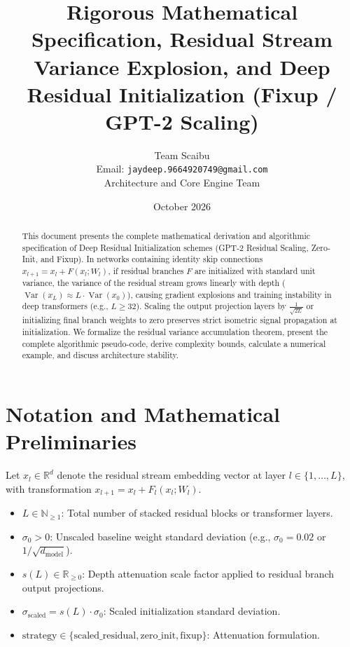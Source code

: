 \documentclass[11pt,a4paper]{article}
\title{\textbf{Rigorous Mathematical Specification, Residual Stream Variance Explosion, and Deep Residual Initialization (Fixup / GPT-2 Scaling)}}
\author{Team Scaibu \\ \small Email: \texttt{jaydeep.9664920749@gmail.com} \\ \small Architecture and Core Engine Team}
\date{October 2026}
\theoremstyle{definition}
\begin{document}
\maketitle

\begin{abstract}
This document presents the complete mathematical derivation and algorithmic specification of Deep Residual Initialization schemes (GPT-2 Residual Scaling, Zero-Init, and Fixup). In networks containing identity skip connections $x_{l+1} = x_l + F(x_l; W_l)$, if residual branches $F$ are initialized with standard unit variance, the variance of the residual stream grows linearly with depth ($\operatorname{Var}(x_L) \approx L \cdot \operatorname{Var}(x_0)$), causing gradient explosions and training instability in deep transformers (e.g., $L \ge 32$). Scaling the output projection layers by $\frac{1}{\sqrt{2L}}$ or initializing final branch weights to zero preserves strict isometric signal propagation at initialization. We formalize the residual variance accumulation theorem, present the complete algorithmic pseudo-code, derive complexity bounds, calculate a numerical example, and discuss architecture stability.
\end{abstract}

\section{Notation and Mathematical Preliminaries}

Let $x_l \in \mathbb{R}^d$ denote the residual stream embedding vector at layer $l \in \{1, \dots, L\}$, with transformation $x_{l+1} = x_l + F_l(x_l; W_l)$.

\begin{itemize}
    \item $L \in \mathbb{N}_{\ge 1}$: Total number of stacked residual blocks or transformer layers.
    \item $\sigma_0 > 0$: Unscaled baseline weight standard deviation (e.g., $\sigma_0 = 0.02$ or $1 / \sqrt{d_{\text{model}}}$).
    \item $s(L) \in \mathbb{R}_{\ge 0}$: Depth attenuation scale factor applied to residual branch output projections.
    \item $\sigma_{\text{scaled}} = s(L) \cdot \sigma_0$: Scaled initialization standard deviation.
    \item $\text{strategy} \in \{\text{scaled\_residual}, \text{zero\_init}, \text{fixup}\}$: Attenuation formulation.
\end{itemize}
\end{document}
